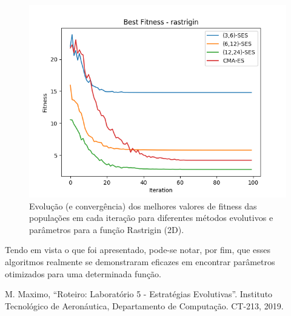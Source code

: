 \documentclass[conference]{IEEEtran}
\begin{document}
\begin{figure}[htbp]
\centering
\centerline{\includegraphics[scale=0.5]{imagens/rastrigin/best_fitness.png}}
\caption{Evolução (e convergência) dos melhores valores de fitness das populações em cada iteração para diferentes métodos evolutivos e parâmetros para a função Rastrigin (2D).}
\label{rastrigin/best_fitness}
\end{figure}

Tendo em vista o que foi apresentado, pode-se notar, por fim, que esses algoritmos realmente se demonstraram eficazes em encontrar parâmetros otimizados para uma determinada função.

\begin{thebibliography}{00}
 M. Maximo, ``Roteiro: Laboratório 5 - Estratégias Evolutivas''. Instituto Tecnológico de Aeronáutica, Departamento de Computação. CT-213, 2019.
\end{thebibliography}
\end{document}
